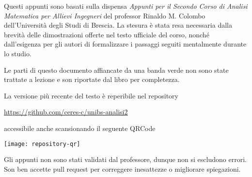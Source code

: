 \documentclass[a4paper,twoside,italian,11pt]{book}
\begin{document}
Questi appunti sono basati sulla dispensa \textit{Appunti per il Secondo Corso di Analisi Matematica per Allievi Ingegneri} del professor Rinaldo M. Colombo dell'Università degli Studi di Brescia. La stesura è stata resa necessaria dalla brevità delle dimostrazioni offerte nel testo ufficiale del corso, nonché dall'esigenza per gli autori di formalizzare i passaggi seguiti mentalmente durante lo studio.
\vspace*{\baselineskip}

\cbstart
Le parti di questo documento affiancate da una banda verde non sono state trattate a lezione e son riportate dal libro per completezza.
\cbend

\vfill
\noindent La versione più recente del testo è reperibile nel repository
\begin{center}
	\url{https://github.com/ceres-c/unibs-analisi2}
\end{center}
accessibile anche scansionando il seguente QRCode
\begin{center}
	\texttt{[image: repository-qr]}
\end{center}
Gli appunti non sono stati validati dal professore, dunque non si escludono errori. Son ben accette pull request per correggere inesattezze o migliorare spiegazioni.










\backmatter
{}
\cleardoublepage
{}
\printindex
\end{document}

